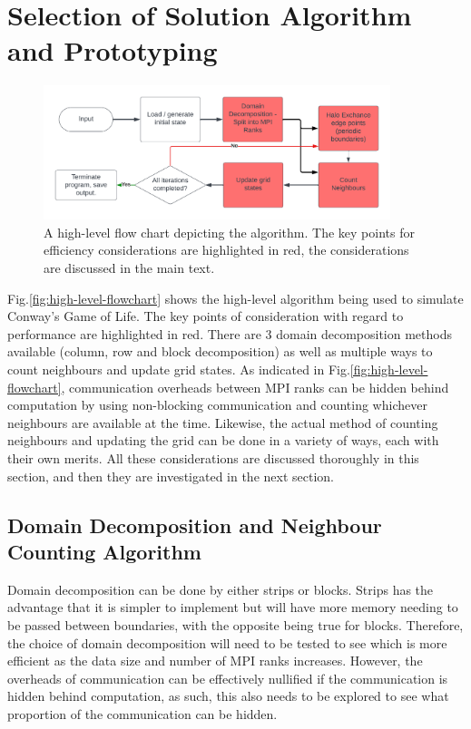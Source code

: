 
\section{Selection of Solution Algorithm and Prototyping}\label{sec:prototyping}
    \begin{figure}[htb]
    \centering
    \includegraphics[width=0.9\textwidth]{./figures/high-level-flowchart}
    \caption{A high-level flow chart depicting the algorithm. The key points for efficiency considerations
    are highlighted in red, the considerations are discussed in the main text.}
    \label{fig:high-level-flowchart}
    \end{figure}

    Fig.\eqref{fig:high-level-flowchart} shows the high-level algorithm being used to simulate Conway's
    Game of Life.
    The key points of consideration with regard to performance are highlighted in red.
    There are 3 domain decomposition methods available (column, row and block decomposition) as well as multiple
    ways to count neighbours and update grid states.
    As indicated in Fig.\eqref{fig:high-level-flowchart}, communication overheads between MPI ranks can be hidden
    behind computation by using non-blocking communication and counting whichever neighbours are available at the time.
    Likewise, the actual method of counting neighbours and updating the grid can be done in a variety of ways, each with
    their own merits.
    All these considerations are discussed thoroughly in this section, and then they are investigated in the next
    section.

    \subsection{Domain Decomposition and Neighbour Counting Algorithm}\label{subsec:domain-decomp}
    Domain decomposition can be done by either strips or blocks.
    Strips has the advantage that it is simpler to implement but will have more memory needing to be passed between
    boundaries, with the opposite being true for blocks.
    Therefore, the choice of domain decomposition will need to be tested to see which is more efficient as the data
    size and number of MPI ranks increases.
    However, the overheads of communication can be effectively nullified if the communication is hidden behind computation,
    as such, this also needs to be explored to see what proportion of the communication can be hidden.

